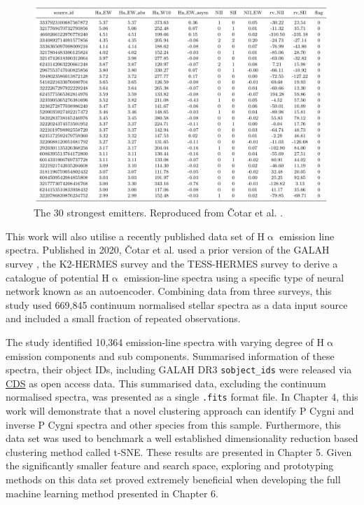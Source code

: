 \begin{figure}[!htb]
\centering
\includegraphics[scale=.45]{figures/cotartable.png}
\caption{The 30 strongest emitters. Reproduced from Čotar et al. \citep{vcotar2021galah}.}
\end{figure}

This work will also utilise a recently published data set of H$\upalpha$ emission line spectra. Published in 2020, Čotar et al. \citep{vcotar2021galah} used a prior version of the GALAH survey \citep{de2015galah}, the K2-HERMES survey \citep{wittenmyer2018k2} and the TESS-HERMES survey \citep{sharma2018tess} to derive a catalogue of potential H$\upalpha$ emission-line spectra using a specific type of neural network known as an autoencoder. Combining data from three surveys, this study used 669,845 continuum normalised stellar spectra as a data input source and included a small fraction of repeated observations. 

The study identified 10,364 emission-line spectra with varying degree of H$\upalpha$ emission components and sub components. Summarised information of these spectra, their object IDs, including GALAH DR3 \texttt{sobject\_ids} were released via \href{https://cdsweb.u-strasbg.fr/}{CDS} as open access data. This summarised data, excluding the continuum normalised spectra, was presented as a single \texttt{.fits} format file. In Chapter 4, this work will demonstrate that a novel clustering approach can identify P Cygni and inverse P Cygni spectra and other species from this sample. Furthermore, this data set was used to benchmark a well established dimensionality reduction based clustering method called t-SNE. These results are presented in Chapter 5. Given the significantly smaller feature and search space, exploring and prototyping methods on this data set proved extremely beneficial when developing the full machine learning method presented in Chapter 6.

